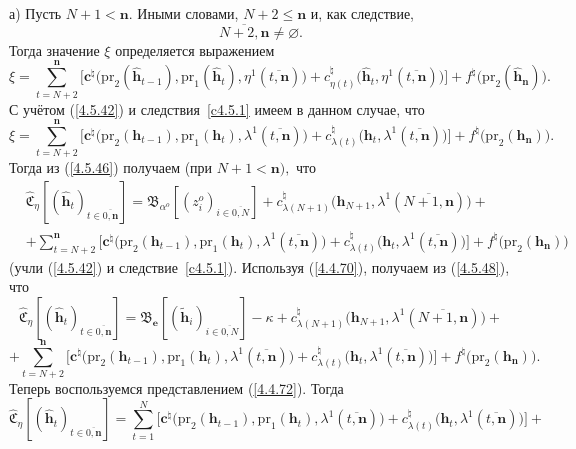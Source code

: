 \documentclass[12pt,twoside]{report}
\newcommand{\ov}{\overline}
\newcommand{\la}{\lambda}
\newcommand{\al}{\alpha}
\newcommand{\emp}{\varnothing}
\begin{document}
{{а) Пусть $N+1 <\mathbf{n}.$ Иными словами, $N+2\leqslant \mathbf{n}$ и, как следствие,
$$
\ov{N+2,\mathbf{n}}\neq \emp.
$$
Тогда значение $\xi$ определяется выражением
$$
\xi = \sum\limits_{t=N+2}^\mathbf{n}\bigl[\mathbf{c}^\natural\bigl(\mathrm{pr}_2(\hat{\mathbf{h}}_{t-1}),
\mathrm{pr}_1(\hat{\mathbf{h}}_t),\eta^1(\ov{t,\mathbf{n}})\bigl) +
c_{\eta(t)}^\natural\bigl(\hat{\mathbf{h}}_t,\eta^1(\ov{t,\mathbf{n}})\bigl)\bigl] +
f^\natural\bigl(\mathrm{pr}_2(\hat{\mathbf{h}}_\mathbf{n})\bigl).
$$
С учётом (\ref{4.5.42}) и следствия~\ref{c4.5.1} имеем в данном случае, что
$$
\xi = \sum\limits_{t=N+2}^\mathbf{n}\bigl[\mathbf{c}^\natural\bigl(\mathrm{pr}_2(\mathbf{h}_{t-1}),
\mathrm{pr}_1(\mathbf{h}_t),\la^1(\ov{t,\mathbf{n}})\bigl) +
c_{\la(t)}^\natural\bigl(\mathbf{h}_t,\la^1(\ov{t,\mathbf{n}})\bigl)\bigl] +
f^\natural\bigl(\mathrm{pr}_2(\mathbf{h}_\mathbf{n})\bigl).
$$
Тогда из (\ref{4.5.46}) получаем (при $N+1 < \mathbf{n}),$ что
\begin{eqnarray}
&\widehat{\mathfrak{C}}_\eta[(\hat{\mathbf{h}}_t)_{t\in\ov{0,\mathbf{n}}}] =
\mathfrak{B}_{\al^o}[(z_i^o)_{i\in\ov{0,N}}] +
c_{\la(N+1)}^\natural\bigl(\mathbf{h}_{N+1},\la^1(\ov{N+1,\mathbf{n}})\bigl)  +
&\nonumber\\
&+ \sum\limits_{t=N+2}^\mathbf{n}\bigl[\mathbf{c}^\natural\bigl(\mathrm{pr}_2(\mathbf{h}_{t-1}),
\mathrm{pr}_1(\mathbf{h}_t),\la^1(\ov{t,\mathbf{n}})\bigl) +
c_{\la(t)}^\natural\bigl(\mathbf{h}_t,\la^1(\ov{t,\mathbf{n}})\bigl)\bigl] +
f^\natural\bigl(\mathrm{pr}_2(\mathbf{h}_\mathbf{n})\bigl)
&\label{4.5.48}
\end{eqnarray}
(учли (\ref{4.5.42}) и следствие~\ref{c4.5.1}).  Используя (\ref{4.4.70}),
получаем из (\ref{4.5.48}), что
$$
\widehat{\mathfrak{C}}_\eta[(\hat{\mathbf{h}}_t)_{t\in\ov{0,\mathbf{n}}}] =
\mathfrak{B}_\mathbf{e}[(\tilde{\mathbf{h}}_i)_{i\in\ov{0,N}}] -\kappa +
c_{\la(N+1)}^\natural\bigl(\mathbf{h}_{N+1},\la^1(\ov{N+1,\mathbf{n}})\bigl) +
$$
$$
+ \sum\limits_{t=N+2}^\mathbf{n}\bigl[\mathbf{c}^\natural\bigl(\mathrm{pr}_2(\mathbf{h}_{t-1}),
\mathrm{pr}_1(\mathbf{h}_t),\la^1(\ov{t,\mathbf{n}})\bigl) +
c_{\la(t)}^\natural\bigl(\mathbf{h}_t,\la^1(\ov{t,\mathbf{n}})\bigl)\bigl] +
f^\natural\bigl(\mathrm{pr}_2(\mathbf{h}_\mathbf{n})\bigl).
$$
Теперь воспользуемся  представлением (\ref{4.4.72}). Тогда
$$
\widehat{\mathfrak{C}}_\eta[(\hat{\mathbf{h}}_t)_{t\in\ov{0,\mathbf{n}}}] =
\sum\limits_{t=1}^N\bigl[\mathbf{c}^\natural\bigl(\mathrm{pr}_2(\mathbf{h}_{t-1}),
\mathrm{pr}_1(\mathbf{h}_t),\la^1(\ov{t,\mathbf{n}})\bigl) +
c_{\la(t)}^\natural\bigl(\mathbf{h}_t,\la^1(\ov{t,\mathbf{n}})\bigl)\bigl] +
$$}}
\end{document}
